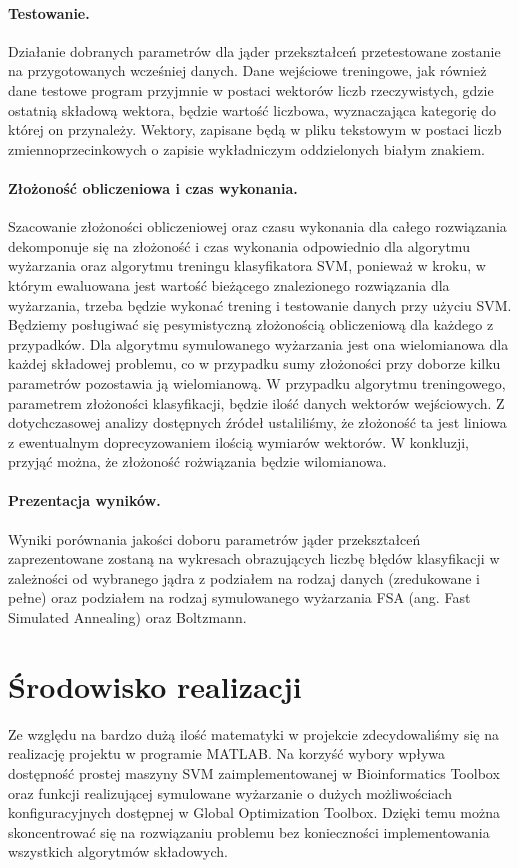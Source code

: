 \documentclass{article}
\begin{document}
\paragraph{Testowanie.}
Działanie dobranych parametrów dla jąder przekształceń przetestowane zostanie na przygotowanych wcześniej danych. Dane wejściowe treningowe, jak również dane testowe program przyjmnie w postaci wektorów liczb rzeczywistych, gdzie ostatnią składową wektora, będzie wartość liczbowa, wyznaczająca kategorię do której on przynależy. Wektory, zapisane będą w pliku tekstowym w postaci liczb zmiennoprzecinkowych o zapisie wykładniczym oddzielonych białym znakiem.
\paragraph{Złożoność obliczeniowa i czas wykonania.}
Szacowanie złożoności obliczeniowej oraz czasu wykonania dla całego rozwiązania dekomponuje się na złożoność i czas wykonania odpowiednio dla algorytmu wyżarzania oraz  algorytmu treningu klasyfikatora SVM, ponieważ w kroku, w którym ewaluowana jest wartość bieżącego znalezionego rozwiązania dla wyżarzania, trzeba będzie wykonać trening i testowanie danych przy użyciu SVM.
Będziemy posługiwać się pesymistyczną złożonością obliczeniową dla każdego z przypadków. Dla algorytmu symulowanego wyżarzania jest ona wielomianowa dla każdej składowej problemu, co w przypadku sumy złożoności przy doborze kilku parametrów pozostawia ją wielomianową. W przypadku algorytmu treningowego, parametrem złożoności klasyfikacji, będzie ilość danych wektorów wejściowych. Z dotychczasowej analizy dostępnych źródeł ustaliliśmy, że złożoność ta jest liniowa z ewentualnym doprecyzowaniem ilością wymiarów wektorów. W konkluzji, przyjąć można, że złożoność rożwiązania będzie wilomianowa.
\paragraph{Prezentacja wyników.}
Wyniki porównania jakości doboru parametrów jąder przekształceń zaprezentowane zostaną na wykresach obrazujących liczbę błędów klasyfikacji w zależności od wybranego jądra z podziałem na rodzaj danych (zredukowane i pełne) oraz podziałem na rodzaj symulowanego wyżarzania FSA (ang. Fast Simulated Annealing) oraz Boltzmann.
\section{Środowisko realizacji}
Ze względu na bardzo dużą ilość matematyki w projekcie zdecydowaliśmy się na realizację projektu w programie MATLAB. Na korzyść wybory wpływa dostępność prostej maszyny SVM zaimplementowanej w Bioinformatics Toolbox oraz funkcji realizującej symulowane wyżarzanie o dużych możliwościach konfiguracyjnych dostępnej w Global Optimization Toolbox. Dzięki temu można skoncentrować się na rozwiązaniu problemu bez konieczności implementowania wszystkich algorytmów składowych.
\end{document}
